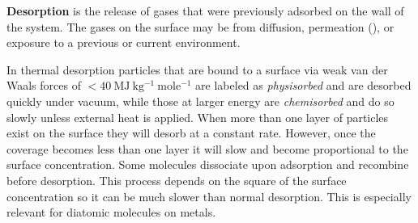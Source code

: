 \begin{table}
\centering
{}
\caption{Outgassing rates of , , , and  from 316L stainless steel after various treatments.  Significant
reductions from bakeouts can be seen.  Before treatment each samble was subjected to a two-hour degreasing with perchlorethylene vapor at
$125^{\circ}\mathrm{C}$, followed by a one-hour ultrasonic washing at $55^{\circ}\mathrm{C}$, and finally were rinsed with clean water and
dried.  Data is taken from .}
\label{tab:electron_lifetime_model_outgassing_treatment_rates}
\end{table}

\textbf{Desorption} is the release of gases that were previously adsorbed on the wall of the system.  The gases on the surface may be from
diffusion, permeation (), or exposure to a previous or current
environment.

In thermal desorption particles that are bound to a surface via weak van der Waals forces of
$< 40\ \mathrm{MJ\ kg^{-1}\ mole^{-1}}$ are labeled
as \textit{physisorbed} and are desorbed quickly under vacuum, while those at larger energy are \textit{chemisorbed} and do so slowly
unless external heat is applied.  When more than one layer of particles exist on the surface they will desorb at a constant
rate.  However, once
the coverage becomes less than one layer it will slow and become proportional to the surface concentration.  Some molecules
dissociate upon adsorption and recombine before desorption.  This process depends on the square of the
surface concentration so it can be much slower than normal desorption.  This is especially relevant for diatomic molecules
on metals.

